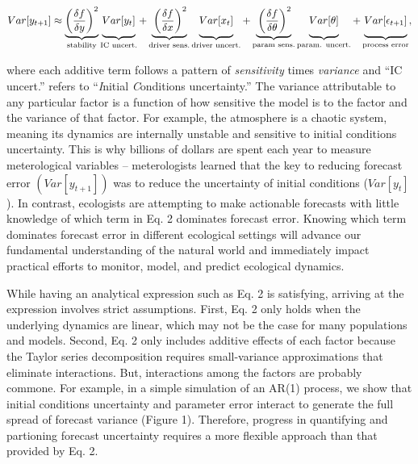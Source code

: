 \documentclass[12pt,]{article}
\begin{document}
\begin{align}
Var[y_{t+1}] \approx \underbrace{\left(\frac{\delta f}{\delta y} \right)^2}_{\text{stability}} 
               \underbrace{\vphantom{ \left(\frac{\delta f}{\delta y} \right)^2 } Var[y_t]}_{\text{IC uncert.}} +
               \underbrace{\vphantom{ \left(\frac{\delta f}{\delta y} \right)^2 }\left(\frac{\delta f}{\delta x} \right)^2}_{\text{driver sens.}} 
               \underbrace{\vphantom{ \left(\frac{\delta f}{\delta y} \right)^2 } Var[x_t]}_{\text{driver uncert.}} +
               \underbrace{\vphantom{ \left(\frac{\delta f}{\delta y} \right)^2 }\left(\frac{\delta f}{\delta \theta} \right)^2}_{\text{param sens.}}
               \underbrace{\vphantom{ \left(\frac{\delta f}{\delta y} \right)^2 } Var[\theta]}_{\text{param. uncert.}} +
               \underbrace{\vphantom{ \left(\frac{\delta f}{\delta y} \right)^2 } Var[\epsilon_{t+1}]}_{\text{process error}},
\end{align}

\noindent{}where each additive term follows a pattern of
\emph{sensitivity} times \emph{variance} and ``IC uncert.'' refers to
``\emph{I}nitial \emph{C}onditions uncertainty.'' The variance
attributable to any particular factor is a function of how sensitive the
model is to the factor and the variance of that factor. For example, the
atmosphere is a chaotic system, meaning its dynamics are internally
unstable and sensitive to initial conditions uncertainty. This is why
billions of dollars are spent each year to measure meterological
variables -- meterologists learned that the key to reducing forecast
error \((Var[y_{t+1}])\) was to reduce the uncertainty of initial
conditions (\(Var[y_t]\)). In contrast, ecologists are attempting to
make actionable forecasts with little knowledge of which term in Eq. 2
dominates forecast error. Knowing which term dominates forecast error in
different ecological settings will advance our fundamental understanding
of the natural world and immediately impact practical efforts to
monitor, model, and predict ecological dynamics.

While having an analytical expression such as Eq. 2 is satisfying,
arriving at the expression involves strict assumptions. First, Eq. 2
only holds when the underlying dynamics are linear, which may not be the
case for many populations and models. Second, Eq. 2 only includes
additive effects of each factor because the Taylor series decomposition
requires small-variance approximations that eliminate interactions. But,
interactions among the factors are probably commone. For example, in a
simple simulation of an AR(1) process, we show that initial conditions
uncertainty and parameter error interact to generate the full spread of
forecast variance (Figure 1). Therefore, progress in quantifying and
partioning forecast uncertainty requires a more flexible approach than
that provided by Eq. 2.
\end{document}

